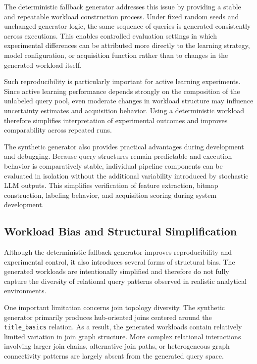The deterministic fallback generator addresses this issue by providing a stable and repeatable workload construction process. Under fixed random seeds and unchanged generator logic, the same sequence of queries is generated consistently across executions. This enables controlled evaluation settings in which experimental differences can be attributed more directly to the learning strategy, model configuration, or acquisition function rather than to changes in the generated workload itself.

Such reproducibility is particularly important for active learning experiments. Since active learning performance depends strongly on the composition of the unlabeled query pool, even moderate changes in workload structure may influence uncertainty estimates and acquisition behavior. Using a deterministic workload therefore simplifies interpretation of experimental outcomes and improves comparability across repeated runs.

The synthetic generator also provides practical advantages during development and debugging. Because query structures remain predictable and execution behavior is comparatively stable, individual pipeline components can be evaluated in isolation without the additional variability introduced by stochastic LLM outputs. This simplifies verification of feature extraction, bitmap construction, labeling behavior, and acquisition scoring during system development.

\subsection{Workload Bias and Structural Simplification}

Although the deterministic fallback generator improves reproducibility and experimental control, it also introduces several forms of structural bias. The generated workloads are intentionally simplified and therefore do not fully capture the diversity of relational query patterns observed in realistic analytical environments.

One important limitation concerns join topology diversity. The synthetic generator primarily produces hub-oriented joins centered around the \texttt{title\_basics} relation. As a result, the generated workloads contain relatively limited variation in join graph structure. More complex relational interactions involving larger join chains, alternative join paths, or heterogeneous graph connectivity patterns are largely absent from the generated query space.

